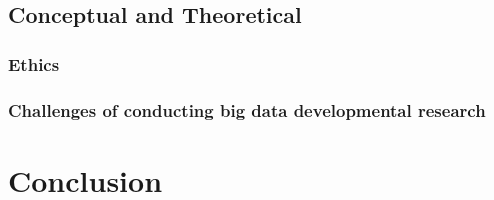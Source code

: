\documentclass[letterpaper,man,apacite]{apa6}
\begin{document}
\subsection{Conceptual and Theoretical}

\subsubsection{Ethics}

\subsubsection{Challenges of conducting big data developmental research}

\section{Conclusion}


\end{document}
